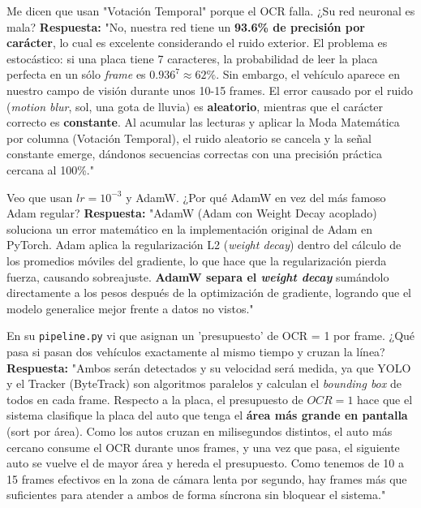 \documentclass[11pt,a4paper]{article}
\begin{document}
\begin{trampa}{Me dicen que usan "Votaci\'on Temporal" porque el OCR falla. ¿Su red neuronal es mala?}
    \textbf{Respuesta:} "No, nuestra red tiene un \textbf{93.6\% de precisi\'on por car\'acter}, lo cual es excelente considerando el ruido exterior. El problema es estoc\'astico: si una placa tiene 7 caracteres, la probabilidad de leer la placa perfecta en un s\'olo \emph{frame} es $0.936^7 \approx 62\%$. 
    Sin embargo, el veh\'iculo aparece en nuestro campo de visi\'on durante unos 10-15 frames. El error causado por el ruido (\emph{motion blur}, sol, una gota de lluvia) es \textbf{aleatorio}, mientras que el car\'acter correcto es \textbf{constante}. Al acumular las lecturas y aplicar la Moda Matem\'atica por columna (Votaci\'on Temporal), el ruido aleatorio se cancela y la se\~nal constante emerge, d\'andonos secuencias correctas con una precisi\'on pr\'actica cercana al 100\%."
\end{trampa}

\begin{pregunta}{Veo que usan $lr=10^{-3}$ y AdamW. ¿Por qu\'e AdamW en vez del m\'as famoso Adam regular?}
    \textbf{Respuesta:} "AdamW (Adam con Weight Decay acoplado) soluciona un error matem\'atico en la implementaci\'on original de Adam en PyTorch. Adam aplica la regularizaci\'on L2 (\emph{weight decay}) dentro del c\'alculo de los promedios m\'oviles del gradiente, lo que hace que la regularizaci\'on pierda fuerza, causando sobreajuste. \textbf{AdamW separa el \emph{weight decay}} sum\'andolo directamente a los pesos despu\'es de la optimizaci\'on de gradiente, logrando que el modelo generalice mejor frente a datos no vistos."
\end{pregunta}

\begin{trampa}{En su \texttt{pipeline.py} vi que asignan un 'presupuesto' de OCR = 1 por frame. ¿Qu\'e pasa si pasan dos veh\'iculos exactamente al mismo tiempo y cruzan la l\'inea?}
    \textbf{Respuesta:} "Ambos ser\'an detectados y su velocidad ser\'a medida, ya que YOLO y el Tracker (ByteTrack) son algoritmos paralelos y calculan el \emph{bounding box} de todos en cada frame. 
    Respecto a la placa, el presupuesto de $OCR=1$ hace que el sistema clasifique la placa del auto que tenga el \textbf{\'area m\'as grande en pantalla} (sort por \'area). Como los autos cruzan en milisegundos distintos, el auto m\'as cercano consume el OCR durante unos frames, y una vez que pasa, el siguiente auto se vuelve el de mayor \'area y hereda el presupuesto. Como tenemos de 10 a 15 frames efectivos en la zona de c\'amara lenta por segundo, hay frames m\'as que suficientes para atender a ambos de forma s\'incrona sin bloquear el sistema."
\end{trampa}
\end{document}
